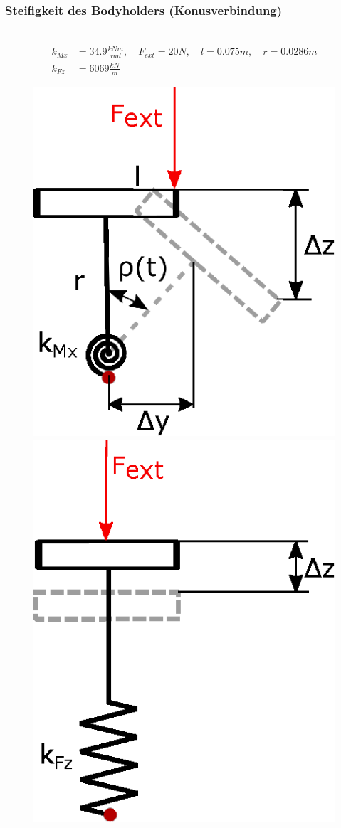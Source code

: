 \documentclass[10pt,a4paper]{iace.report}
\begin{document}
				 \subsubsection{Steifigkeit des Bodyholders (Konusverbindung)}\leavevmode\\
					\begin{align*}
					k_{Mx} &= 34.9\frac{kNm}{rad},\quad F_{ext}=20N,\quad l=0.075m,\quad r=0.0286m\\
					k_{Fz} &= 6069\frac{kN}{m}
					\end{align*}
					\begin{figure}[!h]
						\centering
						\includegraphics[width=0.3\linewidth]{./pics/bodyHolder.eps}\hspace{0.5cm}
						\includegraphics[width=0.25\linewidth]{./pics/bodyHolder_axial.eps}
					\end{figure}
\end{document}
